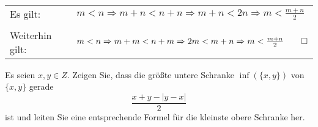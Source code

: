 \bigskip

\begin{lsg}[L\"osung~2]
	~\\[2ex]
	\begin{tabular}{ll}
		Es gilt: & $m<n \Rightarrow m+n<n+n \Rightarrow m+n<2n \Rightarrow m< \frac{m+n}{2}$ \\
		&\\
	Weiterhin gilt: & $m<n \Rightarrow m+m < n+m \Rightarrow 2m < m+n \Rightarrow m<\frac{m+n}{2} \qed$\\
	\end{tabular}



\end{lsg}


\bigskip


\begin{aufg}[6 Punkte]
Es seien $x,y\in Z$. Zeigen Sie, dass die gr\"o{\ss}te untere Schranke $\inf(\{x,y\})$ von $\{x,y\}$ gerade 
\[
\frac{x+y - |y-x|}{2}
\]
ist und leiten Sie eine entsprechende Formel f\"ur die kleinste obere Schranke her.
\end{aufg}


\bigskip

